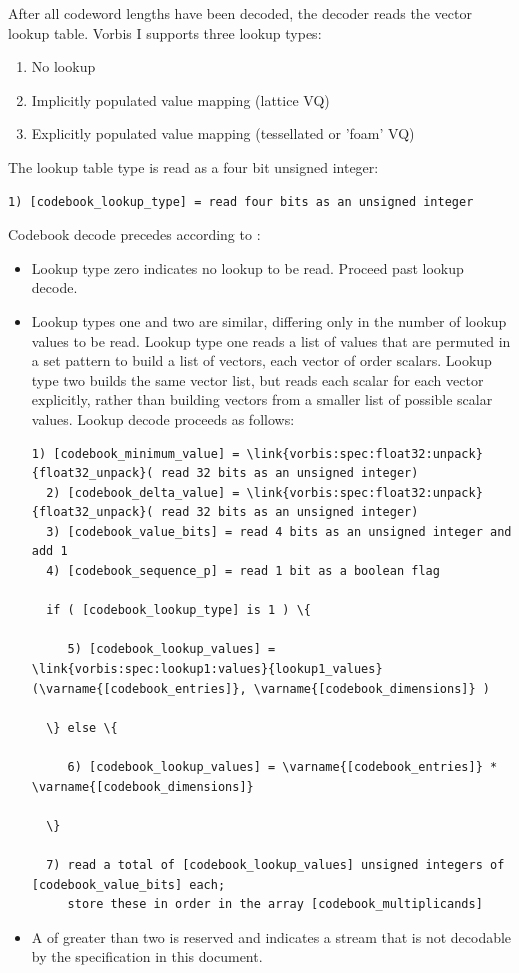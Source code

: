 After all codeword lengths have been decoded, the decoder reads the
vector lookup table.  Vorbis I supports three lookup types:
\begin{enumerate}
\item
No lookup
\item
Implicitly populated value mapping (lattice VQ)
\item
Explicitly populated value mapping (tessellated or 'foam'
VQ)
\end{enumerate}


The lookup table type is read as a four bit unsigned integer:
\begin{Verbatim}[commandchars=\\\{\}]
  1) [codebook_lookup_type] = read four bits as an unsigned integer
\end{Verbatim}

Codebook decode precedes according to :
\begin{itemize}
\item
Lookup type zero indicates no lookup to be read.  Proceed past
lookup decode.
\item
Lookup types one and two are similar, differing only in the
number of lookup values to be read.  Lookup type one reads a list of
values that are permuted in a set pattern to build a list of vectors,
each vector of order  scalars.  Lookup
type two builds the same vector list, but reads each scalar for each
vector explicitly, rather than building vectors from a smaller list of
possible scalar values.  Lookup decode proceeds as follows:

\begin{Verbatim}[commandchars=\\\{\}]
  1) [codebook_minimum_value] = \link{vorbis:spec:float32:unpack}{float32_unpack}( read 32 bits as an unsigned integer)
  2) [codebook_delta_value] = \link{vorbis:spec:float32:unpack}{float32_unpack}( read 32 bits as an unsigned integer)
  3) [codebook_value_bits] = read 4 bits as an unsigned integer and add 1
  4) [codebook_sequence_p] = read 1 bit as a boolean flag

  if ( [codebook_lookup_type] is 1 ) \{

     5) [codebook_lookup_values] = \link{vorbis:spec:lookup1:values}{lookup1_values}(\varname{[codebook_entries]}, \varname{[codebook_dimensions]} )

  \} else \{

     6) [codebook_lookup_values] = \varname{[codebook_entries]} * \varname{[codebook_dimensions]}

  \}

  7) read a total of [codebook_lookup_values] unsigned integers of [codebook_value_bits] each;
     store these in order in the array [codebook_multiplicands]
\end{Verbatim}
\item
A  of greater than two is reserved
and indicates a stream that is not decodable by the specification in this
document.

\end{itemize}


